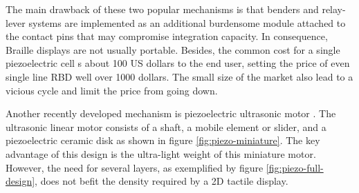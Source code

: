 The main drawback of these two popular mechanisms is that benders and relay-lever systems are implemented as an additional burdensome module attached to the contact pins that may compromise integration capacity. In consequence, Braille displays are not usually portable. Besides, the common cost for a single piezoelectric cell s about 100 US dollars to the end user, setting the price of even single line RBD well over 1000 dollars. The small size of the market also lead to a vicious cycle and limit the price from going down.

Another recently developed mechanism is piezoelectric ultrasonic motor \cite{hernandez_characterization_2009}.
The ultrasonic linear motor consists of a shaft, a mobile element or slider, and a piezoelectric ceramic disk as shown in figure \ref{fig:piezo-miniature}.
The key advantage of this design is the ultra-light weight of this miniature motor.
However, the need for several layers, as exemplified by figure \ref{fig:piezo-full-design}, does not befit the density required by a 2D tactile display.

